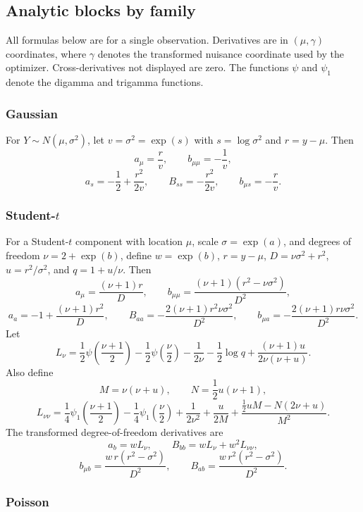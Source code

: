 \documentclass{article}
\begin{document}
\subsection{Analytic blocks by family}

All formulas below are for a single observation.  Derivatives are in
$(\mu,\gamma)$ coordinates, where $\gamma$ denotes the transformed nuisance
coordinate used by the optimizer.  Cross-derivatives not displayed are zero.
The functions $\psi$ and $\psi_1$ denote the digamma and trigamma functions.

\subsubsection*{Gaussian}

For $Y\sim N(\mu,\sigma^2)$, let $v=\sigma^2=\exp(s)$ with
$s=\log\sigma^2$ and $r=y-\mu$.  Then
\[
    a_\mu=\frac{r}{v},\qquad
    b_{\mu\mu}=-\frac{1}{v},
\]
\[
    a_s=-\frac12+\frac{r^2}{2v},\qquad
    B_{ss}=-\frac{r^2}{2v},\qquad
    b_{\mu s}=-\frac{r}{v}.
\]

\subsubsection*{Student-$t$}

For a Student-$t$ component with location $\mu$, scale
$\sigma=\exp(a)$, and degrees of freedom $\nu=2+\exp(b)$, define
$w=\exp(b)$, $r=y-\mu$, $D=\nu\sigma^2+r^2$, $u=r^2/\sigma^2$, and
$q=1+u/\nu$.  Then
\[
    a_\mu=\frac{(\nu+1)r}{D},\qquad
    b_{\mu\mu}=\frac{(\nu+1)(r^2-\nu\sigma^2)}{D^2},
\]
\[
    a_a=-1+\frac{(\nu+1)r^2}{D},\qquad
    B_{aa}=-\frac{2(\nu+1)r^2\nu\sigma^2}{D^2},\qquad
    b_{\mu a}=-\frac{2(\nu+1)r\nu\sigma^2}{D^2}.
\]
Let
\[
    L_\nu=
    \frac12\psi\!\left(\frac{\nu+1}{2}\right)
    -\frac12\psi\!\left(\frac{\nu}{2}\right)
    -\frac{1}{2\nu}
    -\frac12\log q
    +\frac{(\nu+1)u}{2\nu(\nu+u)} .
\]
Also define
\[
    M=\nu(\nu+u),\qquad
    N=\frac12u(\nu+1),
\]
\[
    L_{\nu\nu}
    =
    \frac14\psi_1\!\left(\frac{\nu+1}{2}\right)
    -\frac14\psi_1\!\left(\frac{\nu}{2}\right)
    +\frac{1}{2\nu^2}
    +\frac{u}{2M}
    +\frac{\frac12uM-N(2\nu+u)}{M^2}.
\]
The transformed degree-of-freedom derivatives are
\[
    a_b=wL_\nu,\qquad
    B_{bb}=wL_\nu+w^2L_{\nu\nu},
\]
\[
    b_{\mu b}
    =
    \frac{w\,r(r^2-\sigma^2)}{D^2},
    \qquad
    B_{ab}
    =
    \frac{w\,r^2(r^2-\sigma^2)}{D^2}.
\]

\subsubsection*{Poisson}
\end{document}
